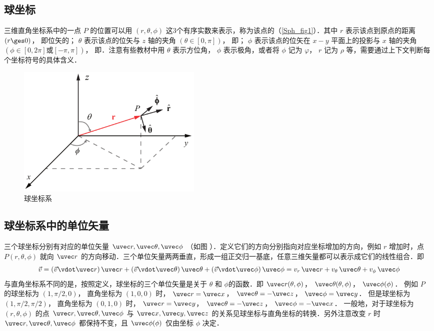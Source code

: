 

\subsection{球坐标}

三维直角坐标系中的一点 $P$ 的位置可以用 $(r,\theta ,\phi )$ 这3个有序实数来表示，称为该点的（\autoref{Sph_fig1}）．其中 $r$ 表示该点到原点的距离 $(r \ges 0)$， 即位矢的； $\theta$ 表示该点的位矢与 $z$ 轴的夹角 $(\theta  \in [0,\pi])$， 即； $\phi$ 表示该点的位矢在 $x - y$ 平面上的投影与 $x$ 轴的夹角 $(\phi  \in [0,2\pi]\text{或}[- \pi,\pi])$， 即．注意有些教材中用 $\theta $ 表示方位角， $\phi $ 表示极角，或者将 $\phi $ 记为 $\varphi $，  $r$ 记为 $\rho $ 等，需要通过上下文判断每个坐标符号的具体含义．

\begin{figure}[ht]
\centering
\includegraphics[width=9cm]{./figures/Sph.pdf}
\caption{球坐标系}\label{Sph_fig1}
\end{figure}

\subsection{球坐标系中的单位矢量}
三个球坐标分别有对应的单位矢量 $\uvec r, \uvec\theta, \uvec\phi$ （如图%
）．定义它们的方向分别指向对应坐标增加的方向，例如 $r$ 增加时，点 $P(r,\theta ,\phi )$ 就向 $\uvec r$ 的方向移动．三个单位矢量两两垂直，形成一组正交归一基底，任意三维矢量都可以表示成它们的线性组合．即
\begin{equation}
\vec v = (\vec v \vdot \uvec r)\,\uvec r + (\vec v \vdot \uvec \theta)\,\uvec \theta  + (\vec v \vdot \uvec \phi)\,\uvec \phi  = v_r \,\uvec r + v_\theta \,\uvec \theta  + v_\phi \,\uvec \phi 
\end{equation}
与直角坐标系不同的是，按照定义，球坐标的三个单位矢量是关于 $\theta$ 和 $\phi$的函数．即
$\uvec r(\theta ,\phi )$，  $\uvec \theta (\theta ,\phi )$，  $\uvec \phi (\phi )$． 
例如 $P$ 的球坐标为 $(1, \pi/2, 0)$， 直角坐标为 $(1, 0, 0)$ 时，
$\uvec r = \uvec x$， $\uvec \theta  =  - \uvec z$， $\uvec \phi  = \uvec y$． 
但是球坐标为 $(1, \pi/2, \pi/2)$， 直角坐标为 $(0, 1, 0)$ 时， $\uvec r = \uvec y$， $\uvec \theta  =  - \uvec z$， $\uvec \phi  =  - \uvec x$． 
一般地，对于球坐标为 $(r, \theta , \phi )$ 的点 $\uvec r, \uvec \theta, \uvec \phi$  与 $\uvec x, \uvec y, \uvec z$ 的关系见球坐标与直角坐标的转换．另外注意改变 $r$ 时 $\uvec r, \uvec \theta, \uvec \phi$ 都保持不变，且 $\uvec \phi (\phi )$ 仅由坐标 $\phi $ 决定．


